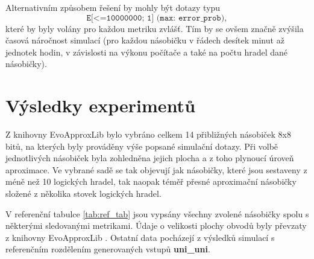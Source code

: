 Alternativním způsobem řešení by mohly být dotazy typu
\begin{equation*}
    \texttt{E[<=10000000; 1] (max: error\_prob)},
\end{equation*}
které by byly volány pro každou metriku zvlášť. Tím by se ovšem značně zvýšila časová náročnost simulací (pro každou násobičku v řádech desítek minut až jednotek hodin, v závislosti na výkonu počítače a také na počtu hradel dané násobičky).

\chapter{Výsledky experimentů}
\label{experimenty}
Z knihovny EvoApproxLib bylo vybráno celkem 14 přibližných násobiček 8x8 bitů, na kterých byly prováděny výše popsané simulační dotazy. Při volbě jednotlivých násobiček byla zohledněna jejich plocha a z toho plynoucí úroveň aproximace. Ve vybrané sadě se tak objevují jak násobičky, které jsou sestaveny z méně než 10 logických hradel, tak naopak téměř přesné aproximační násobičky složené z několika stovek logických hradel.

V referenční tabulce \ref{tab:ref_tab} jsou vypsány všechny zvolené násobičky spolu s některými sledovanými metrikami. Údaje o velikosti plochy obvodů byly převzaty z knihovny EvoApproxLib \cite{circuit_library}. Ostatní data pocházejí z výsledků simulací s referenčním rozdělením generovaných vstupů \textbf{uni\_uni}.

